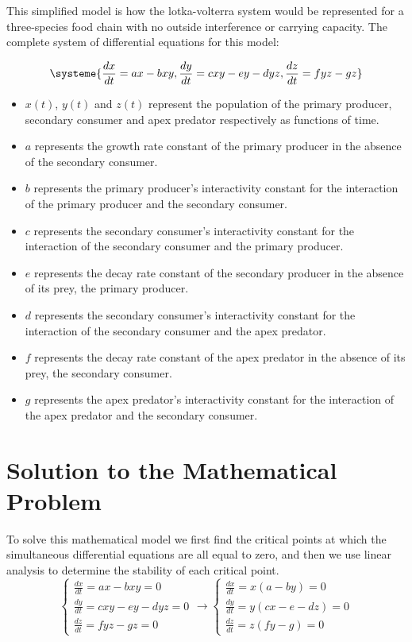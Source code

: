 \documentclass[11pt,oneside]{article}
\begin{document}
	This simplified model is how the lotka-volterra system would be represented for a three-species food chain with no outside interference or carrying capacity. The complete system of differential equations for this model:
	
	\begin{equation}
	\systeme{
		\frac{dx}{dt} = ax - bxy,
		\frac{dy}{dt} = cxy - ey -dyz,
		\frac{dz}{dt} = fyz - gz
	}
	\end{equation}
	\begin{itemize}
		\item $x(t)$, $y(t)$ and $z(t)$ represent the population of the primary producer, secondary consumer and apex predator respectively as functions of time.
		\item $a$ represents the growth rate constant of the primary producer in the absence of the secondary consumer.
		\item $b$ represents the primary producer's interactivity constant for the interaction of the primary producer and the secondary consumer.
		\item $c$ represents the secondary consumer's interactivity constant for the interaction of the secondary consumer and the primary producer.
		\item $e$ represents the decay rate constant of the secondary producer in the absence of its prey, the primary producer.
		\item $d$ represents the secondary consumer's interactivity constant for the interaction of the secondary consumer and the apex predator.
		\item $f$ represents the decay rate constant of the apex predator in the absence of its prey, the secondary consumer.
		\item $g$ represents the apex predator's interactivity constant for the interaction of the apex predator and the secondary consumer.
	\end{itemize}
	
	
	\section{Solution to the Mathematical Problem}
	To solve this mathematical model we first find the critical points at which the simultaneous differential equations are all equal to zero, and then we use linear analysis to determine the stability of each critical point. 
	\begin{equation}
	\begin{cases}
	\frac{dx}{dt} = ax - bxy = 0\\
	\frac{dy}{dt} = cxy - ey -dyz = 0\\
	\frac{dz}{dt} = fyz - gz = 0
	\end{cases}
	\rightarrow
	\begin{cases}
	\frac{dx}{dt} = x(a-by) = 0\\
	\frac{dy}{dt} = y(cx - e -dz) = 0\\
	\frac{dz}{dt} = z(fy - g) = 0
	\end{cases}
	\end{equation}
	
\end{document}
